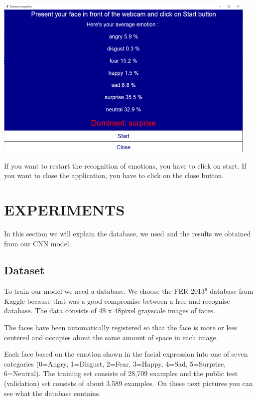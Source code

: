 \documentclass[a4paper, 10pt, conference]{ieeeconf}      %
\begin{document}
\begin{center}
\includegraphics[scale=0.7]{Interface2}
\label{fig6}
\end{center}

If you want to restart the recognition of emotions, you have to click on start. If you want to close the application, you have to click on the close button.

\section{EXPERIMENTS}
In this section we will explain the database, we used and the results we obtained from our CNN model.

\subsection{Dataset}
To train our model we need a database.
We choose the FER-2013$^6$ database from Kaggle because that was a good compromise between a free and recognise database.
The data consists of 48 x 48pixel grayscale images of faces.\

The faces have been automatically registered so that the face is more or less centered and occupies about the same amount of space in each image.\

Each face based on the emotion shown in the facial expression into one of seven categories (0=Angry, 1=Disgust, 2=Fear, 3=Happy, 4=Sad, 5=Surprise, 6=Neutral).
The training set consists of 28,709 examples and the public test (validation) set consists of about 3,589 examples.\
On these next pictures you can see what the database contains.
\end{document}
